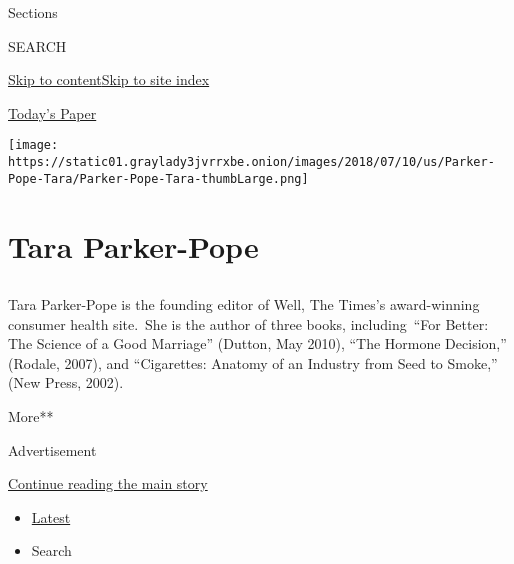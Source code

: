 Sections

SEARCH

\protect\hyperlink{site-content}{Skip to
content}\protect\hyperlink{site-index}{Skip to site index}

\href{https://myaccount.nytimes3xbfgragh.onion/auth/login?response_type=cookie\&client_id=vi}{}

\href{https://www.nytimes3xbfgragh.onion/section/todayspaper}{Today's
Paper}

\texttt{[image: https://static01.graylady3jvrrxbe.onion/images/2018/07/10/us/Parker-Pope-Tara/Parker-Pope-Tara-thumbLarge.png]}

\hypertarget{tara-parker-pope}{%
\section{Tara Parker-Pope}\label{tara-parker-pope}}

\subsection{}

Tara Parker-Pope is the founding editor of Well, The Times's
award-winning consumer health site.~She is the author of three books,
including~``For Better: The Science of a Good Marriage'' (Dutton, May
2010), ``The Hormone Decision,'' (Rodale, 2007), and ``Cigarettes:
Anatomy of an Industry from Seed to Smoke,'' (New Press, 2002).

More**

Advertisement

\protect\hyperlink{after-mid1}{Continue reading the main story}

\begin{itemize}
\tightlist
\item
  \protect\hyperlink{stream-panel}{Latest}
\item
  Search
\end{itemize}

